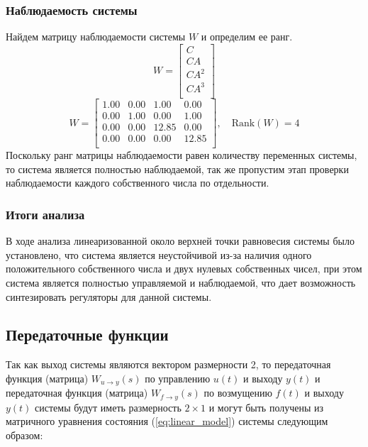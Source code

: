 \subsubsection{Наблюдаемость системы}
Найдем матрицу наблюдаемости системы $W$ и определим ее ранг.
\begin{equation}
    W = \begin{bmatrix}
    C \\ 
    CA \\ 
    CA^2 \\ 
    CA^3 \\ 
    \end{bmatrix}
\end{equation}
\begin{equation}
    W = \begin{bmatrix}
    1.00  & 0.00  & 1.00  & 0.00 \\ 
    0.00  & 1.00  & 0.00  & 1.00 \\ 
    0.00  & 0.00  & 12.85  & 0.00 \\ 
    0.00  & 0.00  & 0.00  & 12.85 \\ 
    \end{bmatrix}, \quad \text{Rank}(W) = 4
\end{equation}
Поскольку ранг матрицы наблюдаемости равен количеству переменных системы, то система является полностью наблюдаемой, так же 
пропустим этап проверки наблюдаемости каждого собственного числа по отдельности. 

\subsubsection{Итоги анализа}
В ходе анализа линеаризованной около верхней точки равновесия системы было установлено, что система является
неустойчивой из-за наличия одного положительного собственного числа и двух нулевых собственных чисел, при этом 
система является полностью управляемой и наблюдаемой, что дает возможность синтезировать регуляторы для 
данной системы. 

\subsection{Передаточные функции}
Так как выход системы являются вектором размерности 2, то передаточная функция (матрица) $W_{u\rightarrow y}(s)$ по 
управлению $u(t)$ и выходу $y(t)$ и передаточная функция (матрица) $W_{f\rightarrow y}(s)$ по 
возмущению $f(t)$ и выходу $y(t)$ системы будут иметь размерность $2 \times 1$ и могут быть получены из матричного уравнения состояния
(\ref{eq:linear_model}) системы следующим образом:

